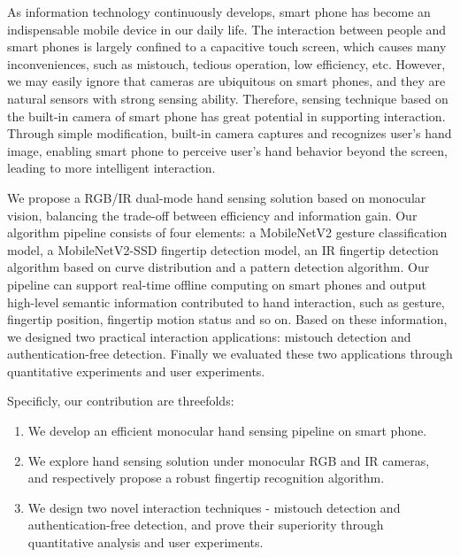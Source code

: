 \begin{eabstract}

As information technology continuously develops, smart phone has become an indispensable mobile device in our daily life. The interaction between people and smart phones is largely confined to a capacitive touch screen, which causes many inconveniences, such as mistouch, tedious operation, low efficiency, etc. However, we may easily ignore that cameras are ubiquitous on smart phones, and they are natural sensors with strong sensing ability. Therefore, sensing technique based on the built-in camera of smart phone has great potential in supporting interaction. Through simple modification, built-in camera captures and recognizes user's hand image, enabling smart phone to perceive user's hand behavior beyond the screen, leading to more intelligent interaction.

We propose a RGB/IR dual-mode hand sensing solution based on monocular vision, balancing the trade-off between efficiency and information gain. Our algorithm pipeline consists of four elements: a MobileNetV2 gesture classification model, a MobileNetV2-SSD fingertip detection model, an IR fingertip detection algorithm based on curve distribution and a pattern detection algorithm. Our pipeline can support real-time offline computing on smart phones and output high-level semantic information contributed to hand interaction, such as gesture, fingertip position, fingertip motion status and so on. Based on these information, we designed two practical interaction applications: mistouch detection and authentication-free detection. Finally we evaluated these two applications through quantitative experiments and user experiments.

Specificly, our contribution are threefolds: 

\begin{enumerate}
    \item We develop an efficient monocular hand sensing pipeline on smart phone.
    \item We explore hand sensing solution under monocular RGB and IR cameras, and respectively propose a robust fingertip recognition algorithm.
    \item We design two novel interaction techniques - mistouch detection and authentication-free detection, and prove their superiority through quantitative analysis and user experiments.
\end{enumerate}

\end{eabstract}

